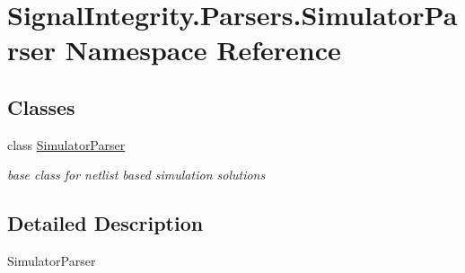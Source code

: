 \hypertarget{namespaceSignalIntegrity_1_1Parsers_1_1SimulatorParser}{}\section{Signal\+Integrity.\+Parsers.\+Simulator\+Parser Namespace Reference}
\label{namespaceSignalIntegrity_1_1Parsers_1_1SimulatorParser}
\subsection*{Classes}
\begin{DoxyCompactItemize}
\item 
class \hyperlink{classSignalIntegrity_1_1Parsers_1_1SimulatorParser_1_1SimulatorParser}{Simulator\+Parser}
\begin{DoxyCompactList}\small\item\em base class for netlist based simulation solutions \end{DoxyCompactList}\end{DoxyCompactItemize}


\subsection{Detailed Description}
\begin{DoxyVerb}SimulatorParser\end{DoxyVerb}
 